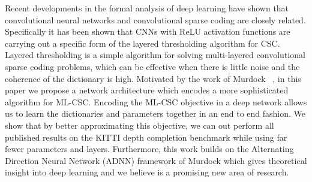 
Recent developments in the formal analysis of deep learning have shown that convolutional neural networks and convolutional sparse coding are closely related. Specifically it has been shown that CNNs with ReLU activation functions are carrying out a specific form of the layered thresholding algorithm for CSC. Layered thresholding is a simple algorithm for solving multi-layered convolutional sparse coding problems, which can be effective when there is little noise and the coherence of the dictionary is high. Motivated by the work of Murdock \etal~\cite{Murdock}, in this paper we propose a network architecture which encodes a more sophisticated algorithm for ML-CSC. Encoding the ML-CSC objective in a deep network allows us to learn the dictionaries and parameters together in an end to end fashion. We show that by better approximating this objective, we can out perform all published results on the KITTI depth completion benchmark while using far fewer parameters and layers. Furthermore, this work builds on the Alternating Direction Neural Network (ADNN) framework of Murdock \etal which gives theoretical insight into deep learning and we believe is a promising new area of research.


